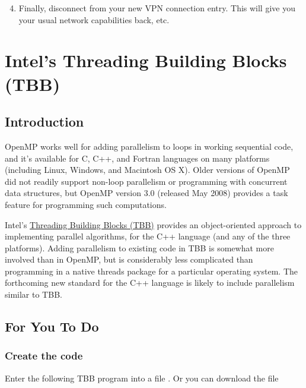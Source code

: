 \documentclass[letterpaper,10pt,openany,oneside]{sphinxmanual}
\begin{document}
\begin{enumerate}
\setcounter{enumi}{3}
\item {} 
Finally, disconnect from your new VPN connection entry. This will give you your usual network capabilities back, etc.

\end{enumerate}


\chapter{Intel's Threading Building Blocks (TBB)}
\label{TBB/TBB:intel-s-threading-building-blocks-tbb}\label{TBB/TBB::doc}\label{TBB/TBB:university-of-ghent-page}

\section{Introduction}
\label{TBB/TBB:introduction}
OpenMP works well for adding parallelism to loops in working sequential code, and it's available for C, C++, and Fortran languages on many platforms (including Linux, Windows, and Macintosh OS X). Older versions of OpenMP did not readily support non-loop parallelism or programming with concurrent data structures, but OpenMP version 3.0 (released May 2008) provides a task feature for programming such computations.

Intel's \href{http://threadingbuildingblocks.org/}{Threading Building Blocks (TBB)} provides an object-oriented approach to implementing parallel algorithms, for the C++ language (and any of the three platforms). Adding parallelism to existing code in TBB is somewhat more involved than in OpenMP, but is considerably less complicated than programming in a native threads package for a particular operating system. The forthcoming new standard for the C++ language is likely to include parallelism similar to TBB.


\section{For You To Do}
\label{TBB/TBB:threading-building-blocks-tbb}\label{TBB/TBB:for-you-to-do}

\subsection{Create the code}
\label{TBB/TBB:create-the-code}
Enter the following TBB program into a file . Or you can download the file 
\end{document}

